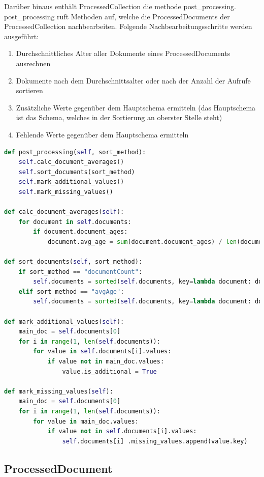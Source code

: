 Darüber hinaus enthält ProcessedCollection die methode post\_processing.
post\_processing ruft Methoden auf, welche die ProcessedDocuments der ProcessedCollection nachbearbeiten.
Folgende Nachbearbeitungsschritte werden ausgeführt:
\begin{enumerate}
    \item Durchschnittliches Alter aller Dokumente eines ProcessedDocuments ausrechnen
    \item Dokumente nach dem Durchschnittsalter oder nach der Anzahl der Aufrufe sortieren
    \item Zusätzliche Werte gegenüber dem Hauptschema ermitteln (das Hauptschema ist das Schema, welches in der Sortierung an oberster Stelle steht)
    \item Fehlende Werte gegenüber dem Hauptschema ermitteln
\end{enumerate}

\begin{lstlisting}[language=python, caption={ProcessedCollection.post\_processing},label={lst:backend_post_processing}]
def post_processing(self, sort_method):
    self.calc_document_averages()
    self.sort_documents(sort_method)
    self.mark_additional_values()
    self.mark_missing_values()

def calc_document_averages(self):
    for document in self.documents:
        if document.document_ages:
            document.avg_age = sum(document.document_ages) / len(document.document_ages)

def sort_documents(self, sort_method):
    if sort_method == "documentCount":
        self.documents = sorted(self.documents, key=lambda document: document.count, reverse=True)
    elif sort_method == "avgAge":
        self.documents = sorted(self.documents, key=lambda document: document.avg_age, reverse=True)

def mark_additional_values(self):
    main_doc = self.documents[0]
    for i in range(1, len(self.documents)):
        for value in self.documents[i].values:
            if value not in main_doc.values:
                value.is_additional = True

def mark_missing_values(self):
    main_doc = self.documents[0]
    for i in range(1, len(self.documents)):
        for value in main_doc.values:
            if value not in self.documents[i].values:
                self.documents[i] .missing_values.append(value.key)
\end{lstlisting}

\subsection{ProcessedDocument}
\label{sub:ba_processed_document}

